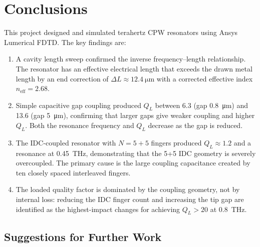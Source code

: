 \documentclass[12pt,a4paper]{article}
\begin{document}
\newpage
\section{Conclusions}
\label{sec:conclusions}

This project designed and simulated terahertz CPW resonators using Ansys
Lumerical FDTD. The key findings are:

\begin{enumerate}
    \item A cavity length sweep confirmed the inverse frequency--length
          relationship. The resonator has an effective electrical length
          that exceeds the drawn metal length by an end correction of
          $\Delta L \approx \SI{12.4}{\micro\metre}$ with a corrected
          effective index $n_{\mathrm{eff}} = 2.68$.

    \item Simple capacitive gap coupling produced $Q_L$ between 6.3
          (gap \SI{0.8}{\micro\metre}) and 13.6 (gap \SI{5}{\micro\metre}),
          confirming that larger gaps give weaker coupling and higher $Q_L$.
          Both the resonance frequency and $Q_L$ decrease as the gap is
          reduced.

    \item The IDC-coupled resonator with $N = 5+5$ fingers produced
          $Q_L \approx 1.2$ and a resonance at \SI{0.45}{\tera\hertz},
          demonstrating that the 5+5 IDC geometry is severely overcoupled.
          The primary cause is the large coupling capacitance created by
          ten closely spaced interleaved fingers.

    \item The loaded quality factor is dominated by the coupling geometry,
          not by internal loss: reducing the IDC finger count and increasing
          the tip gap are identified as the highest-impact changes for
          achieving $Q_L > 20$ at \SI{0.8}{\tera\hertz}.
\end{enumerate}

\subsection{Suggestions for Further Work}
\end{document}
